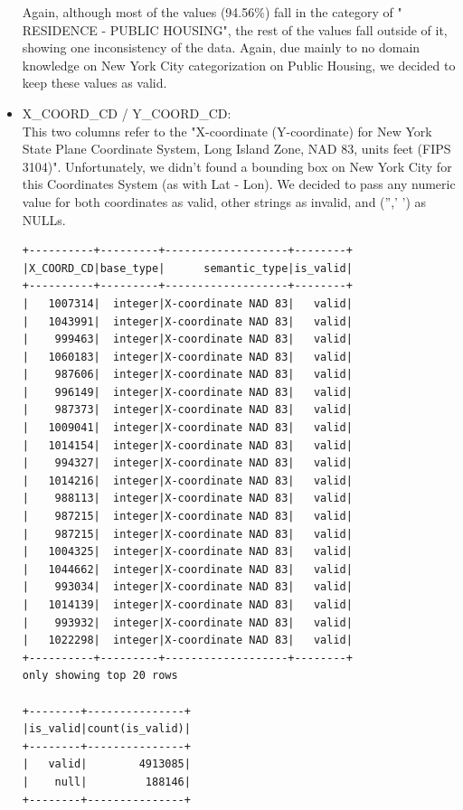 \documentclass{article}
\begin{document}
\begin{itemize}
Again, although most of the values (94.56\%) fall in the category of " RESIDENCE - PUBLIC HOUSING", the rest of the values fall outside of it, showing one inconsistency of the data. Again, due mainly to no domain knowledge on New York City categorization on Public Housing, we decided to keep these values as valid. 

\item X\_COORD\_CD / Y\_COORD\_CD: \\
This two columns refer to the "X-coordinate (Y-coordinate) for New York State Plane Coordinate System, Long Island Zone, NAD 83, units feet (FIPS 3104)". Unfortunately, we didn't found a bounding box on New York City for this Coordinates System (as with Lat - Lon). We decided to pass any numeric value for both coordinates as valid,  other strings as invalid, and ('',' ') as NULLs. 

\begin{verbatim}
+----------+---------+-------------------+--------+
|X_COORD_CD|base_type|      semantic_type|is_valid|
+----------+---------+-------------------+--------+
|   1007314|  integer|X-coordinate NAD 83|   valid|
|   1043991|  integer|X-coordinate NAD 83|   valid|
|    999463|  integer|X-coordinate NAD 83|   valid|
|   1060183|  integer|X-coordinate NAD 83|   valid|
|    987606|  integer|X-coordinate NAD 83|   valid|
|    996149|  integer|X-coordinate NAD 83|   valid|
|    987373|  integer|X-coordinate NAD 83|   valid|
|   1009041|  integer|X-coordinate NAD 83|   valid|
|   1014154|  integer|X-coordinate NAD 83|   valid|
|    994327|  integer|X-coordinate NAD 83|   valid|
|   1014216|  integer|X-coordinate NAD 83|   valid|
|    988113|  integer|X-coordinate NAD 83|   valid|
|    987215|  integer|X-coordinate NAD 83|   valid|
|    987215|  integer|X-coordinate NAD 83|   valid|
|   1004325|  integer|X-coordinate NAD 83|   valid|
|   1044662|  integer|X-coordinate NAD 83|   valid|
|    993034|  integer|X-coordinate NAD 83|   valid|
|   1014139|  integer|X-coordinate NAD 83|   valid|
|    993932|  integer|X-coordinate NAD 83|   valid|
|   1022298|  integer|X-coordinate NAD 83|   valid|
+----------+---------+-------------------+--------+
only showing top 20 rows

+--------+---------------+
|is_valid|count(is_valid)|
+--------+---------------+
|   valid|        4913085|
|    null|         188146|
+--------+---------------+


\end{verbatim}
\end{itemize}
\end{document}
